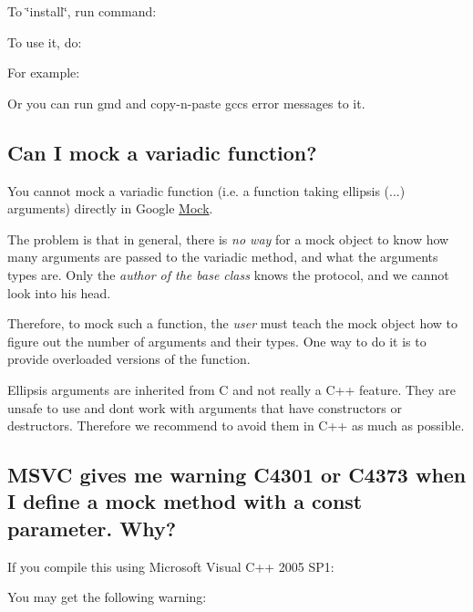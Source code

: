 To \char`\"{}install\char`\"{}, run command\+: 
\begin{DoxyCode}{0}
\end{DoxyCode}


To use it, do\+: 
\begin{DoxyCode}{0}
\end{DoxyCode}


For example\+: 
\begin{DoxyCode}{0}
\end{DoxyCode}


Or you can run {\ttfamily gmd} and copy-\/n-\/paste gcc\textquotesingle{}s error messages to it.

\subsection*{Can I mock a variadic function?}

You cannot mock a variadic function (i.\+e. a function taking ellipsis ({\ttfamily ...}) arguments) directly in Google \mbox{\hyperlink{class_mock}{Mock}}.

The problem is that in general, there is {\itshape no way} for a mock object to know how many arguments are passed to the variadic method, and what the arguments\textquotesingle{} types are. Only the {\itshape author of the base class} knows the protocol, and we cannot look into his head.

Therefore, to mock such a function, the {\itshape user} must teach the mock object how to figure out the number of arguments and their types. One way to do it is to provide overloaded versions of the function.

Ellipsis arguments are inherited from C and not really a C++ feature. They are unsafe to use and don\textquotesingle{}t work with arguments that have constructors or destructors. Therefore we recommend to avoid them in C++ as much as possible.

\subsection*{M\+S\+VC gives me warning C4301 or C4373 when I define a mock method with a const parameter. Why?}

If you compile this using Microsoft Visual C++ 2005 S\+P1\+: 
\begin{DoxyCode}{0}
\DoxyCodeLine{\};}
\DoxyCodeLine{}
\DoxyCodeLine{\};}
\end{DoxyCode}
 You may get the following warning\+: 
\begin{DoxyCode}{0}
\end{DoxyCode}


